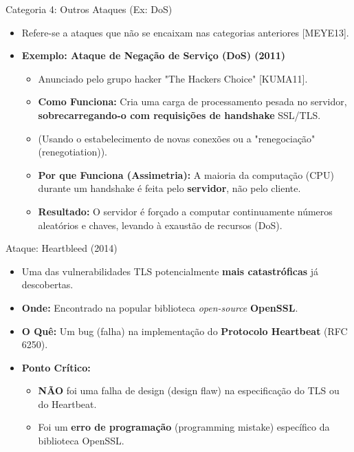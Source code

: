 \begin{frame}{Categoria 4: Outros Ataques (Ex: DoS)}
    \begin{itemize}
        \item Refere-se a ataques que não se encaixam nas categorias anteriores [MEYE13].

        \item \textbf{Exemplo: Ataque de Negação de Serviço (DoS) (2011)}
              \begin{itemize}
                  \item Anunciado pelo grupo hacker "The Hackers Choice" [KUMA11].
                  \item \textbf{Como Funciona:} Cria uma carga de processamento pesada no servidor, \textbf{sobrecarregando-o com requisições de handshake} SSL/TLS.
                  \item (Usando o estabelecimento de novas conexões ou a "renegociação" (renegotiation)).
                  \item \textbf{Por que Funciona (Assimetria):} A maioria da computação (CPU) durante um handshake é feita pelo \textbf{servidor}, não pelo cliente.
                  \item \textbf{Resultado:} O servidor é forçado a computar continuamente números aleatórios e chaves, levando à exaustão de recursos (DoS).
              \end{itemize}
    \end{itemize}
\end{frame}

\begin{frame}{Ataque: Heartbleed (2014)}
    \begin{itemize}
        \item Uma das vulnerabilidades TLS potencialmente \textbf{mais catastróficas} já descobertas.

        \item \textbf{Onde:} Encontrado na popular biblioteca \textit{open-source} \textbf{OpenSSL}.

        \item \textbf{O Quê:} Um bug (falha) na implementação do \textbf{Protocolo Heartbeat} (RFC 6250).

        \item \textbf{Ponto Crítico:}
              \begin{itemize}
                  \item \textbf{NÃO} foi uma falha de design (design flaw) na especificação do TLS ou do Heartbeat.
                  \item Foi um \textbf{erro de programação} (programming mistake) específico da biblioteca OpenSSL.
              \end{itemize}
    \end{itemize}
\end{frame}

